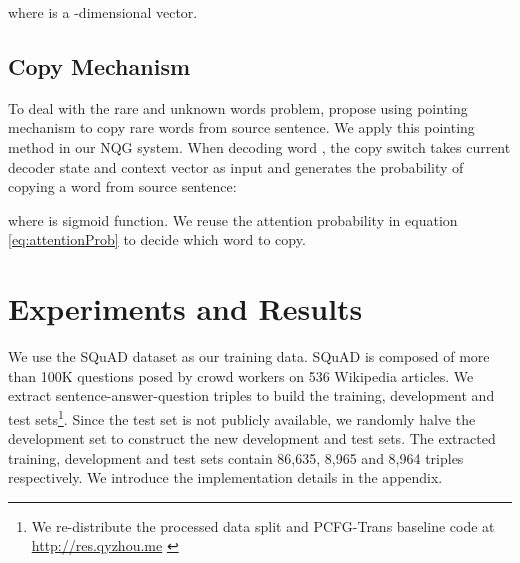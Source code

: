 \documentclass[11pt,letterpaper]{article}
\newif\ifanonymous
\newcommand{\ourModelName}{NQG}
\begin{document}
where  is a -dimensional vector.

\subsection{Copy Mechanism}
To deal with the rare and unknown words problem, \citet{gulcehre-EtAl:2016:P16-1} propose using pointing mechanism to copy rare words from source sentence.
We apply this pointing method in our \ourModelName{} system.
When decoding word , the copy switch takes current decoder state  and context vector  as input and generates the probability  of copying a word from source sentence:

where  is sigmoid function. We reuse the attention probability in equation \ref{eq:attentionProb} to decide which word to copy. 

\section{Experiments and Results}

We use the SQuAD dataset as our training data.
SQuAD is composed of more than 100K questions posed by crowd workers on 536 Wikipedia articles.
We extract sentence-answer-question triples to build the training, development and test sets\footnote{\label{label:releaseData}We re-distribute the processed data split and PCFG-Trans baseline code at {\ifanonymous an anonymous url for blind review.\else \url{http://res.qyzhou.me} \fi} }.
Since the test set is not publicly available, we randomly halve the development set to construct the new development and test sets.
The extracted training, development and test sets contain 86,635, 8,965 and 8,964 triples respectively.
We introduce the implementation details in the appendix.
\end{document}
